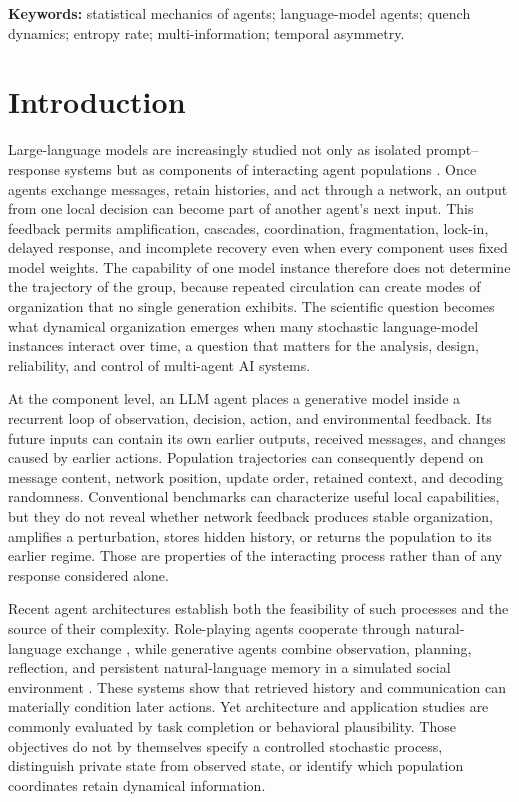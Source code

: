 \documentclass[12pt]{article}
\begin{document}
\noindent\textbf{Keywords:} statistical mechanics of agents; language-model
agents; quench dynamics; entropy rate; multi-information; temporal asymmetry.

\section{Introduction}
\label{sec:introduction}

Large-language models are increasingly studied not only as isolated
prompt--response systems but as components of interacting agent populations
\cite{wang2024agents,guo2024multiagents}.  Once agents exchange messages,
retain histories, and act through a network, an output from one local decision
can become part of another agent's next input.  This feedback permits
amplification, cascades, coordination, fragmentation, lock-in, delayed
response, and incomplete recovery even when every component uses fixed model
weights.  The capability of one model instance therefore does not determine
the trajectory of the group, because repeated circulation can create modes of
organization that no single generation exhibits.  The scientific question
becomes what dynamical organization emerges when many stochastic
language-model instances interact
over time, a question that matters for the analysis, design, reliability, and
control of multi-agent AI systems.

At the component level, an LLM agent places a generative model inside a
recurrent loop of observation, decision, action, and environmental feedback.
Its future inputs can contain its own earlier outputs, received messages, and
changes caused by earlier actions.  Population trajectories can consequently
depend on message content, network position, update order, retained context,
and decoding randomness.  Conventional benchmarks can characterize useful
local capabilities, but they do not reveal whether network feedback produces
stable organization, amplifies a perturbation, stores hidden history, or
returns the population to its earlier regime.  Those are properties of the
interacting process rather than of any response considered alone.

Recent agent architectures establish both the feasibility of such processes
and the source of their complexity.  Role-playing agents cooperate through
natural-language exchange \cite{li2023camel}, while generative agents combine
observation, planning, reflection, and persistent natural-language memory in a
simulated social environment \cite{park2023generative}.  These systems show
that retrieved history and communication can materially condition later
actions.  Yet architecture and application studies are commonly evaluated by
task completion or behavioral plausibility.  Those objectives do not by
themselves specify a controlled stochastic process, distinguish private state
from observed state, or identify which population coordinates retain
dynamical information.
\end{document}
